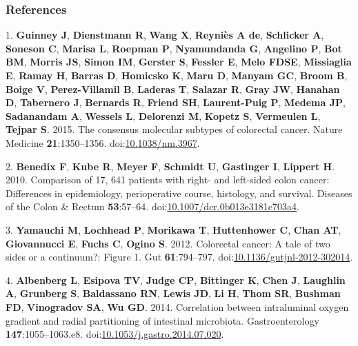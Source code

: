 \documentclass[11pt,]{article}
\begin{document}
\subsubsection*{References}\label{references}

\hypertarget{refs}{}
\hypertarget{ref-Guinney2015}{}
1. \textbf{Guinney J}, \textbf{Dienstmann R}, \textbf{Wang X},
\textbf{Reyniès A de}, \textbf{Schlicker A}, \textbf{Soneson C},
\textbf{Marisa L}, \textbf{Roepman P}, \textbf{Nyamundanda G},
\textbf{Angelino P}, \textbf{Bot BM}, \textbf{Morris JS}, \textbf{Simon
IM}, \textbf{Gerster S}, \textbf{Fessler E}, \textbf{Melo FDSE},
\textbf{Missiaglia E}, \textbf{Ramay H}, \textbf{Barras D},
\textbf{Homicsko K}, \textbf{Maru D}, \textbf{Manyam GC}, \textbf{Broom
B}, \textbf{Boige V}, \textbf{Perez-Villamil B}, \textbf{Laderas T},
\textbf{Salazar R}, \textbf{Gray JW}, \textbf{Hanahan D},
\textbf{Tabernero J}, \textbf{Bernards R}, \textbf{Friend SH},
\textbf{Laurent-Puig P}, \textbf{Medema JP}, \textbf{Sadanandam A},
\textbf{Wessels L}, \textbf{Delorenzi M}, \textbf{Kopetz S},
\textbf{Vermeulen L}, \textbf{Tejpar S}. 2015. The consensus molecular
subtypes of colorectal cancer. Nature Medicine \textbf{21}:1350--1356.
doi:\href{https://doi.org/10.1038/nm.3967}{10.1038/nm.3967}.

\hypertarget{ref-Benedix2010}{}
2. \textbf{Benedix F}, \textbf{Kube R}, \textbf{Meyer F},
\textbf{Schmidt U}, \textbf{Gastinger I}, \textbf{Lippert H}. 2010.
Comparison of 17, 641 patients with right- and left-sided colon cancer:
Differences in epidemiology, perioperative course, histology, and
survival. Diseases of the Colon \& Rectum \textbf{53}:57--64.
doi:\href{https://doi.org/10.1007/dcr.0b013e3181c703a4}{10.1007/dcr.0b013e3181c703a4}.

\hypertarget{ref-Yamauchi2012}{}
3. \textbf{Yamauchi M}, \textbf{Lochhead P}, \textbf{Morikawa T},
\textbf{Huttenhower C}, \textbf{Chan AT}, \textbf{Giovannucci E},
\textbf{Fuchs C}, \textbf{Ogino S}. 2012. Colorectal cancer: A tale of
two sides or a continuum?: Figure 1. Gut \textbf{61}:794--797.
doi:\href{https://doi.org/10.1136/gutjnl-2012-302014}{10.1136/gutjnl-2012-302014}.

\hypertarget{ref-Albenberg2014}{}
4. \textbf{Albenberg L}, \textbf{Esipova TV}, \textbf{Judge CP},
\textbf{Bittinger K}, \textbf{Chen J}, \textbf{Laughlin A},
\textbf{Grunberg S}, \textbf{Baldassano RN}, \textbf{Lewis JD},
\textbf{Li H}, \textbf{Thom SR}, \textbf{Bushman FD}, \textbf{Vinogradov
SA}, \textbf{Wu GD}. 2014. Correlation between intraluminal oxygen
gradient and radial partitioning of intestinal microbiota.
Gastroenterology \textbf{147}:1055--1063.e8.
doi:\href{https://doi.org/10.1053/j.gastro.2014.07.020}{10.1053/j.gastro.2014.07.020}.
\end{document}
